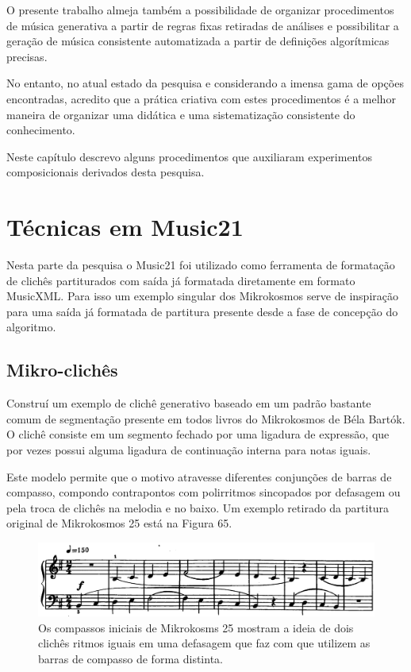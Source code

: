 \documentclass[
	12pt,				%
	openright,			%
	twoside,			%
	a4paper,			%
	english,			%
	french,				%
	spanish,			%
	brazil				%
	]{abntex2}
\begin{document}
O presente trabalho almeja também a possibilidade de organizar procedimentos de música generativa a partir de regras fixas retiradas de análises e possibilitar a geração de música consistente automatizada a partir de definições algorítmicas precisas. 

No entanto, no atual estado da pesquisa e considerando a imensa gama de opções encontradas, acredito que a prática criativa com estes procedimentos é a melhor maneira de organizar uma didática e uma sistematização consistente do conhecimento. 

Neste capítulo descrevo alguns procedimentos que auxiliaram experimentos composicionais derivados desta pesquisa. 

\section{Técnicas em Music21}

Nesta parte da pesquisa o Music21 foi utilizado como ferramenta de formatação de clichês partiturados com saída já formatada diretamente em formato MusicXML. Para isso um exemplo singular dos Mikrokosmos serve de inspiração para uma saída já formatada de partitura presente desde a fase de concepção do algoritmo.

\subsection{Mikro-clichês}
\label{mikrocliches}

Construí um exemplo de clichê generativo baseado em um padrão bastante comum de segmentação presente em todos livros do Mikrokosmos de Béla Bartók. O clichê consiste em um segmento fechado por uma ligadura de expressão, que por vezes possui alguma ligadura de continuação interna para notas iguais. 

Este modelo permite que o motivo atravesse diferentes conjunções de barras de compasso, compondo contrapontos com polirritmos sincopados por defasagem ou pela troca de clichês na melodia e no baixo. Um exemplo retirado da partitura original de Mikrokosmos 25 está na Figura 65.

\begin{figure}[!h]
	\caption{\label{fig_grafico}Os compassos iniciais de Mikrokosms 25 mostram a ideia de dois clichês ritmos iguais em uma defasagem que faz com que utilizem as barras de compasso de forma distinta. }
	\begin{center}
	    \includegraphics[scale=0.35]{score/mikro25.png}
	\end{center}
\end{figure}
\end{document}
